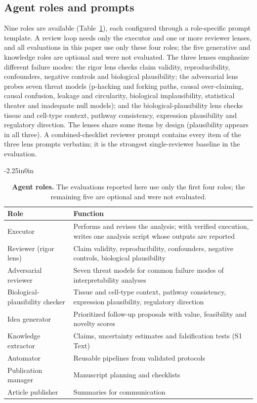\documentclass[10pt,letterpaper]{article}
\begin{document}
\subsection*{Agent roles and prompts}

Nine roles are available (Table~\ref{table_roles}), each configured through a role-specific prompt template. A review loop needs only the executor and one or more reviewer lenses, and all evaluations in this paper use only these four roles; the five generative and knowledge roles are optional and were not evaluated. The three lenses emphasize different failure modes: the rigor lens checks claim validity, reproducibility, confounders, negative controls and biological plausibility; the adversarial lens probes seven threat models (p-hacking and forking paths, causal over-claiming, causal confusion, leakage and circularity, biological implausibility, statistical theater and inadequate null models); and the biological-plausibility lens checks tissue and cell-type context, pathway consistency, expression plausibility and regulatory direction. The lenses share some items by design (plausibility appears in all three). A combined-checklist reviewer prompt contains every item of the three lens prompts verbatim; it is the strongest single-reviewer baseline in the evaluation.

\begin{table}[!ht]
\begin{adjustwidth}{-2.25in}{0in}
\centering
\caption{{\bf Agent roles.} The evaluations reported here use only the first four roles; the remaining five are optional and were not evaluated.}
\label{table_roles}
\begin{tabular}{@{}lp{10.5cm}@{}}
\hline
\textbf{Role} & \textbf{Function} \\ \hline
Executor & Performs and revises the analysis; with verified execution, writes one analysis script whose outputs are reported \\
Reviewer (rigor lens) & Claim validity, reproducibility, confounders, negative controls, biological plausibility \\
Adversarial reviewer & Seven threat models for common failure modes of interpretability analyses \\
Biological-plausibility checker & Tissue and cell-type context, pathway consistency, expression plausibility, regulatory direction \\
Idea generator & Prioritized follow-up proposals with value, feasibility and novelty scores \\
Knowledge extractor & Claims, uncertainty estimates and falsification tests (S1 Text) \\
Automator & Reusable pipelines from validated protocols \\
Publication manager & Manuscript planning and checklists \\
Article publisher & Summaries for communication \\ \hline
\end{tabular}
\end{adjustwidth}
\end{table}
\end{document}
